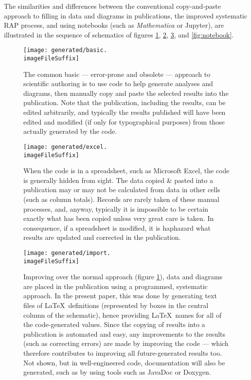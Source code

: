 \documentclass[10pt,a4paper]{article}
\begin{document}


The similarities and differences between the conventional copy-and-paste approach to filling in data and diagrams in publications, the improved systematic RAP process, and using notebooks (such as \emph{Mathematica\/} or Jupyter), are illustrated in the sequence of schematics of figures \ref{fig:basic}, \ref{fig:excel}, \ref{fig:rap}, and \ref{fig:notebook}.

\begin{figure} 
   \centering
   \texttt{[image: generated/basic.\\imageFileSuffix]} 
   \caption{The common basic --- error-prone and obsolete --- approach to scientific authoring is to use code to help generate analyses and diagrams, then manually copy and paste the selected results into the publication. Note that the publication, including the results, can be edited arbitrarily, and typically the results published will have been edited and modified (if only for typographical purposes) from those actually generated by the code.}
   \label{fig:basic}
\end{figure}
\begin{figure} 
   \centering
   \texttt{[image: generated/excel.\\imageFileSuffix]} 
   \caption{When the code is in a spreadsheet, such as Microsoft Excel, the code is generally hidden from sight. The data copied \& pasted into a publication may or may not be calculated from data in other cells (such as column totals). Records are rarely taken of these manual processes, and, anyway, typically it is impossible to be certain exactly what has been copied unless very great care is taken. In consequence, if a spreadsheet is modified, it is haphazard what results are updated and corrected in the publication. }
   \label{fig:excel}
\end{figure}
\begin{figure} 
   \centering
   \texttt{[image: generated/import.\\imageFileSuffix]} 
   \caption{Improving over the normal approach (figure \ref{fig:basic}), data and diagrams are placed in the publication using a programmed, systematic approach. In the present paper, this was done by generating text files of \LaTeX\ definitions (represented by boxes in the central column of the schematic), hence providing \LaTeX\ names for all of the code-generated values. Since the copying of results into a publication is automated and easy, any improvements to the results (such as correcting errors) are made by improving the code --- which therefore contributes to improving all future-generated results too. Not shown, but in well-engineered code, documentation will also be generated, such as by using tools such as JavaDoc or Doxygen.}
   \label{fig:rap}
\end{figure}
\end{document}
